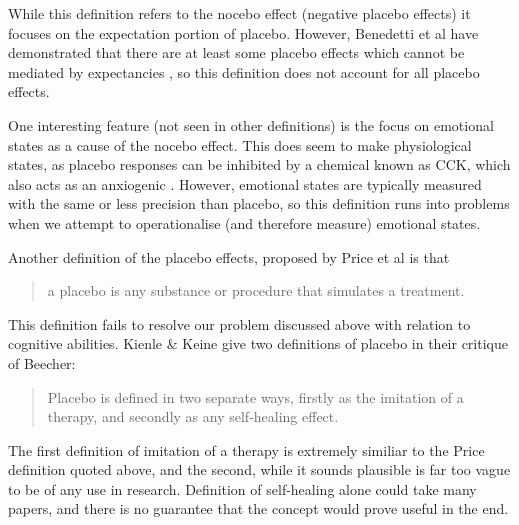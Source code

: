 While this definition refers to the nocebo effect (negative placebo effects) it focuses on the expectation portion of placebo. However, Benedetti et al have demonstrated that there are at least some placebo effects which cannot be mediated by expectancies \cite{Benedetti2003a}, so this definition does not account for all placebo effects. 

One interesting feature (not seen in other definitions) is the focus on emotional states as a cause of the nocebo effect. This does seem to make physiological states, as placebo responses can be inhibited by a chemical known as CCK, which also acts as an anxiogenic \cite{Benedetti2006c}. However, emotional states are typically measured with the same or less precision than placebo, so this definition runs into problems when we attempt to operationalise (and therefore measure) emotional states. 



Another definition of the placebo effects,  proposed by Price et al \cite{Price2008} is that

\begin{quotation}
  a placebo is any substance or procedure that simulates a treatment.
\end{quotation}

This definition fails to resolve our problem discussed above with relation to cognitive abilities. 
Kienle \& Keine give two definitions of placebo in their critique of Beecher:

\begin{quotation}
Placebo is defined in two separate ways, firstly as the imitation of a
therapy, and secondly as any self-healing effect. 
\end{quotation}

The first definition of imitation of a therapy is extremely similiar to the Price definition quoted above, and the second, while it sounds plausible is far too vague to be of any use in research. Definition of self-healing alone could take many papers, and there is no guarantee that the concept would prove useful in the end. 

